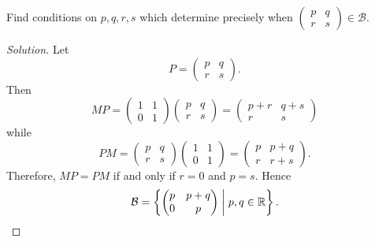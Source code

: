 Find conditions on $p, q, r, s$ which determine precisely when
$\begin{pmatrix} p & q \\ r & s \end{pmatrix} \in \mathcal{B}$.
\begin{proof}[Solution]
  Let
  \begin{equation*}
    P = \begin{pmatrix} p & q \\ r & s \end{pmatrix}.
  \end{equation*}
  Then
  \begin{equation*}
    MP = \begin{pmatrix} 1 & 1 \\ 0 & 1 \end{pmatrix}
    \begin{pmatrix} p & q \\ r & s \end{pmatrix}
    = \begin{pmatrix} p + r & q + s \\ r & s \end{pmatrix}
  \end{equation*}
  while
  \begin{equation*}
    PM = \begin{pmatrix} p & q \\ r & s \end{pmatrix}
    \begin{pmatrix} 1 & 1 \\ 0 & 1 \end{pmatrix}
    = \begin{pmatrix} p & p + q \\ r & r + s \end{pmatrix}.
  \end{equation*}
  Therefore, $MP = PM$ if and only if $r = 0$ and $p = s$. Hence
  \begin{equation*}
    \mathcal{B} = \left\{ \begin{pmatrix} p & p + q \\ 0 & p \end{pmatrix}
      \;\middle|\; p, q\in\mathbb{R} \right\}. \qedhere
  \end{equation*}
\end{proof}

